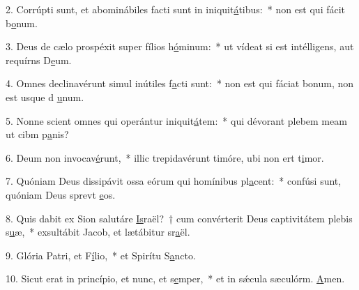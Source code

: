2. Corrúpti sunt, et abominábiles facti sunt in iniquit\uline{á}tibus:~* non est qui fácit b\uline{o}num.\par 
3. Deus de cælo prospéxit super fílios h\uline{ó}minum:~* ut vídeat si est intélligens, aut requírns D\uline{e}um.\par 
4. Omnes declinavérunt simul inútiles f\uline{a}cti sunt:~* non est qui fáciat bonum, non est usque d \uline{u}num.\par 
5. Nonne scient omnes qui operántur iniquit\uline{á}tem:~* qui dévorant plebem meam ut cibm p\uline{a}nis?\par 
6. Deum non invocav\uline{é}runt,~* illic trepidavérunt timóre, ubi non ert t\uline{i}mor.\par 
7. Quóniam Deus dissipávit ossa eórum qui homínibus pl\uline{a}cent:~* confúsi sunt, quóniam Deus sprevt \uline{e}os.\par 
8. Quis dabit ex Sion salutáre \uline{Is}raël?~† cum convérterit Deus captivitátem plebis s\uline{u}æ,~* exsultábit Jacob, et lætábitur sr\uline{a}ël.\par 
9. Glória Patri, et F\uline{í}lio,~* et Spirítu S\uline{a}ncto.\par 
10. Sicut erat in princípio, et nunc, et s\uline{e}mper,~* et in sǽcula sæculórm. \uline{A}men.\par 
